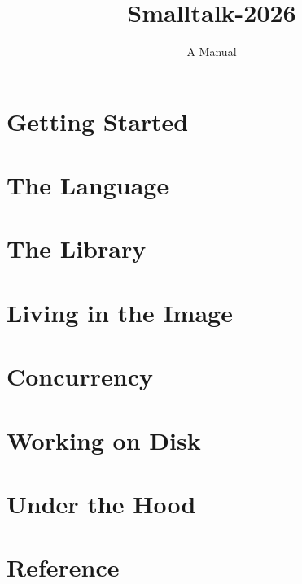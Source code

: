 \documentclass[11pt,openright,twoside]{book}
\title{Smalltalk-2026}
\author{A Manual}
\date{}
\begin{document}
\frontmatter

\tableofcontents

\mainmatter

\part{Getting Started}




\part{The Language}









\part{The Library}










\part{Living in the Image}





\part{Concurrency}




\part{Working on Disk}




\part{Under the Hood}


\appendix
\part{Reference}





\end{document}
